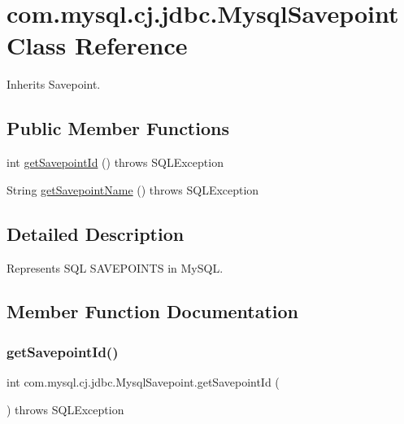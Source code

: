 \hypertarget{classcom_1_1mysql_1_1cj_1_1jdbc_1_1_mysql_savepoint}{}\section{com.\+mysql.\+cj.\+jdbc.\+Mysql\+Savepoint Class Reference}
\label{classcom_1_1mysql_1_1cj_1_1jdbc_1_1_mysql_savepoint}


Inherits Savepoint.

\subsection*{Public Member Functions}
\begin{DoxyCompactItemize}
\item 
int \mbox{\hyperlink{classcom_1_1mysql_1_1cj_1_1jdbc_1_1_mysql_savepoint_ab64c9dd0d86c8bf512f5c72657d5b9e3}{get\+Savepoint\+Id}} ()  throws S\+Q\+L\+Exception 
\item 
String \mbox{\hyperlink{classcom_1_1mysql_1_1cj_1_1jdbc_1_1_mysql_savepoint_a1888db0eac58d2eb0d3394ea3c38d601}{get\+Savepoint\+Name}} ()  throws S\+Q\+L\+Exception 
\end{DoxyCompactItemize}


\subsection{Detailed Description}
Represents S\+QL S\+A\+V\+E\+P\+O\+I\+N\+TS in My\+S\+QL. 

\subsection{Member Function Documentation}
\mbox{\label{classcom_1_1mysql_1_1cj_1_1jdbc_1_1_mysql_savepoint_ab64c9dd0d86c8bf512f5c72657d5b9e3}} 
\subsubsection{\texorpdfstring{get\+Savepoint\+Id()}{getSavepointId()}}
{\footnotesize\ttfamily int com.\+mysql.\+cj.\+jdbc.\+Mysql\+Savepoint.\+get\+Savepoint\+Id (\begin{DoxyParamCaption}{ }\end{DoxyParamCaption}) throws S\+Q\+L\+Exception}

